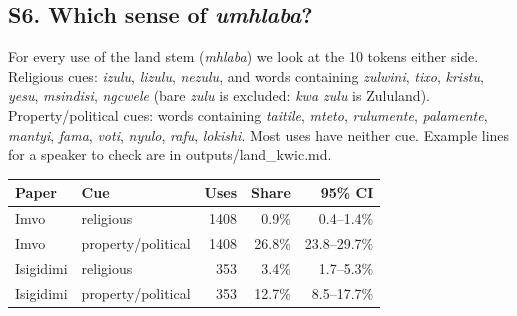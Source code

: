 \subsection*{S6. Which sense of \emph{umhlaba}?}
For every use of the land stem (\emph{mhlaba}) we look at the 10 tokens either side. Religious cues: \emph{izulu}, \emph{lizulu}, \emph{nezulu}, and words containing \emph{zulwini}, \emph{tixo}, \emph{kristu}, \emph{yesu}, \emph{msindisi}, \emph{ngcwele} (bare \emph{zulu} is excluded: \emph{kwa zulu} is Zululand). Property/political cues: words containing \emph{taitile}, \emph{mteto}, \emph{rulumente}, \emph{palamente}, \emph{mantyi}, \emph{fama}, \emph{voti}, \emph{nyulo}, \emph{rafu}, \emph{lokishi}. Most uses have neither cue. Example lines for a speaker to check are in outputs/land\_kwic.md.\\[2pt]
\begin{tabular}{@{}llrrr@{}}
\toprule
Paper & Cue & Uses & Share & 95\% CI \\ \midrule
Imvo & religious & 1408 & 0.9\% & 0.4--1.4\% \\
Imvo & property/political & 1408 & 26.8\% & 23.8--29.7\% \\
Isigidimi & religious & 353 & 3.4\% & 1.7--5.3\% \\
Isigidimi & property/political & 353 & 12.7\% & 8.5--17.7\% \\
\bottomrule
\end{tabular}

